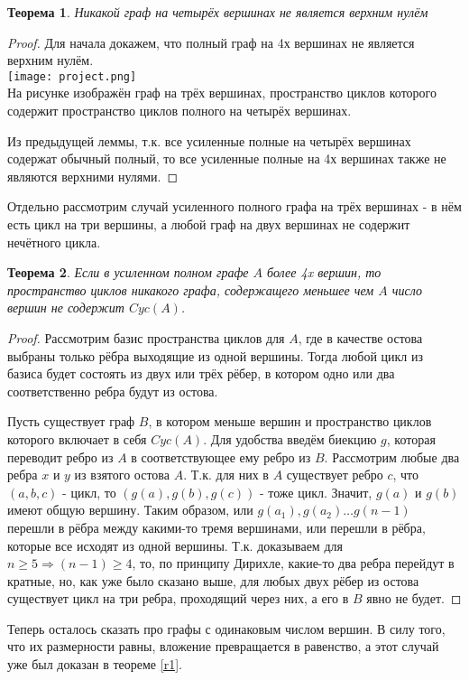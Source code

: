 \documentclass[a4paper]{article}
\newtheorem{theorem}{Теорема}[section]
\theoremstyle{definition}
\begin{document}
\begin{theorem}
Никакой граф на четырёх вершинах не является верхним нулём
\end{theorem}
\begin{proof}
Для начала докажем, что полный граф на 4х вершинах не является верхним нулём.\\
\texttt{[image: project.png]}\\
На рисунке изображён граф на трёх вершинах, пространство циклов которого содержит пространство циклов полного на четырёх вершинах.

Из предыдущей леммы, т.к. все усиленные полные на четырёх вершинах содержат обычный полный, то все усиленные полные на 4х вершинах также не являются верхними нулями.
\end{proof}
Отдельно рассмотрим случай усиленного полного графа на трёх вершинах - в нём есть цикл на три вершины, а любой граф на двух вершинах не содержит нечётного цикла.
\begin{theorem}
Если в усиленном полном графе $A$ более 4x вершин, то пространство циклов никакого графа, содержащего меньшее чем $A$ число вершин не содержит $Cyc(A)$.
\end{theorem}
\begin{proof}
Рассмотрим базис пространства циклов для $A$, где в качестве остова выбраны только рёбра выходящие из одной вершины. Тогда любой цикл из базиса будет состоять из двух или трёх рёбер, в котором одно или два соответственно ребра будут из остова.

Пусть существует граф $B$, в котором меньше вершин и пространство циклов которого включает в себя $Cyc(A)$. Для удобства введём биекцию $g$, которая переводит ребро из $A$  в соответствующее ему ребро из $B$. Рассмотрим любые два ребра $x$ и $y$ из взятого остова $A$. Т.к. для них в $A$ существует ребро $c$, что $(a, b, c)$ - цикл, то $(g(a), g(b), g(c))$ - тоже цикл. Значит, $g(a)$ и $g(b)$ имеют общую вершину. Таким образом, или $g(a_1), g(a_2) \ldots g(n - 1)$ перешли в рёбра между какими-то тремя вершинами, или перешли в рёбра, которые все исходят из одной вершины. Т.к. доказываем для $n \ge 5 \Rightarrow (n - 1) \ge 4$, то, по принципу Дирихле, какие-то два ребра перейдут в кратные, но, как уже было сказано выше, для любых двух рёбер из остова существует цикл на три ребра, проходящий через них, а его в $B$ явно не будет.
\end{proof}

Теперь осталось сказать про графы с одинаковым числом вершин. В силу того, что их размерности равны, вложение превращается в равенство, а этот случай уже был доказан в теореме \ref{r1}.
\end{document}
